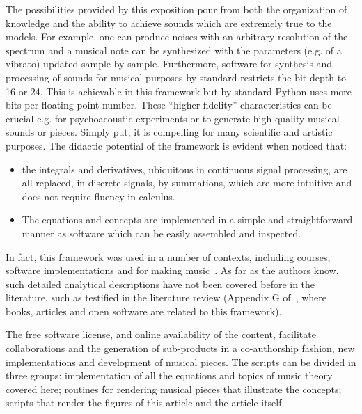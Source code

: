 The possibilities provided by this exposition pour from both the organization of knowledge and the ability to achieve sounds which are extremely true to the models.
For example, one can produce noises with an arbitrary resolution of the spectrum and a musical note can be synthesized with the parameters (e.g. of a vibrato) updated sample-by-sample.
Furthermore, software for synthesis and processing of sounds for musical purposes
by standard restricts the bit depth to 16 or 24.
This is achievable in this framework but by standard Python uses more bits per floating point number.
These ``higher fidelity'' characteristics can be crucial
e.g. for psychoacoustic experiments or to generate high quality musical sounds or pieces.
Simply put, it is compelling
for many scientific and artistic purposes.
The didactic potential of the framework is evident when noticed that:
\begin{itemize}
	\item the integrals and derivatives, ubiquitous in continuous signal processing,
are all replaced, in discrete signals, by summations,
which are more intuitive and does not require fluency in calculus.
	\item The equations and concepts are implemented in a simple and straightforward manner as software which can be easily assembled and inspected.
\end{itemize}
\noindent In fact, this framework was used in a number of contexts, including courses, software implementations and for making music~\cite{vimeoLM,vivace,dissertacao}.
As far as the authors know, such detailed analytical descriptions have not been covered before in the literature, such as testified in the literature review (Appendix G of~\cite{dissertacao}, where books, articles and open software are related to this framework).

The free software license, and online availability of the content,
facilitate collaborations and the generation of sub-products in a co-authorship fashion,
new implementations and development of musical pieces.
The scripts can be divided in three groups: implementation of all the equations and topics of music theory covered here; routines for rendering musical pieces that illustrate the concepts; scripts that render the figures of this article and the article itself.


